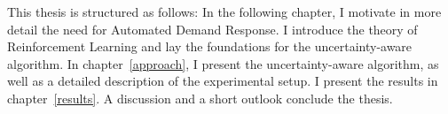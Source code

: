 This thesis is structured as follows: In the following chapter, I motivate in more detail the need for Automated Demand Response. I introduce the theory of Reinforcement Learning and lay the foundations for the uncertainty-aware algorithm.
In chapter~\ref{approach}, I present the uncertainty-aware algorithm, as well as a detailed description of the experimental setup.
I present the results in chapter~\ref{results}. A discussion and a short outlook conclude the thesis.


 
